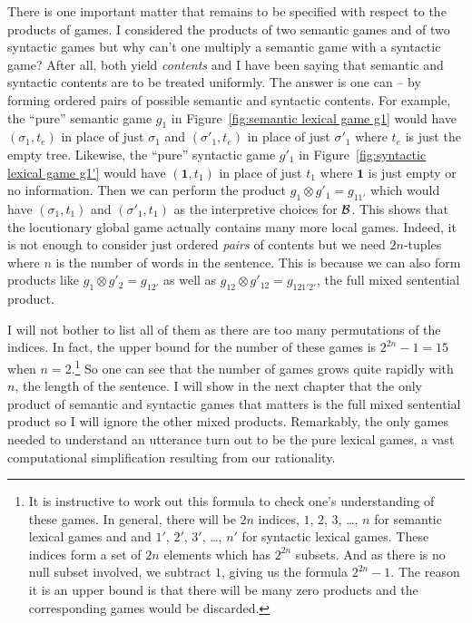 There is one important matter that remains to be specified with respect to the products of games. I considered the products of two semantic games and of two syntactic games but why can't one multiply a semantic game with a syntactic game? After all, both yield \emph{contents} and I have been saying that semantic and syntactic contents are to be treated uniformly. The answer is one can -- by forming ordered pairs of possible semantic and syntactic contents. For example, the ``pure'' semantic game $g_1$ in Figure~\ref{fig:semantic lexical game g1} would have $(\sigma_1,t_e)$ in place of just $\sigma_1$ and $(\sigma'_1,t_e)$ in place of just $\sigma'_1$ where $t_e$ is just the empty tree. Likewise, the ``pure'' syntactic game $g'_1$ in Figure~\ref{fig:syntactic lexical game g1'} would have $(\mathbf{1},t_1)$ in place of just $t_1$ where $\mathbf{1}$ is just empty or no information. Then we can perform the product $g_1 \otimes g'_1 = g_{11'}$ which would have $(\sigma_1,t_1)$ and $(\sigma'_1,t_1)$ as the interpretive choices for $\cal B$. This shows that the locutionary global game actually contains many more local games. Indeed, it is not enough to consider just ordered \emph{pairs} of contents but we need $2n$-tuples where $n$ is the number of words in the sentence. This is because we can also form products like $g_1 \otimes g'_2 = g_{12'}$ as well as $g_{12} \otimes g'_{12} = g_{121'2'}$, the full mixed sentential product.\label{page:mixed products}\largerpage

I will not bother to list all of them as there are too many permutations of the indices. In fact, the upper bound for the number of these games is $2^{2n} - 1 = 15$ when $n = 2$.{\footnote{It is instructive to work out this formula to check one's understanding of these games. In general, there will be $2n$ indices, $1$, $2$, $3$, \ldots, $n$ for semantic lexical games and and $1'$, $2'$, $3'$, \ldots, $n'$ for syntactic lexical games. These indices form a set of $2n$ elements which has $2^{2n}$ subsets. And as there is no null subset involved, we subtract $1$, giving us the formula $2^{2n} - 1$. The reason it is an upper bound is that there will be many zero products and the corresponding games would be discarded.}} So one can see that the number of games grows quite rapidly with $n$, the length of the sentence. I will show in the next chapter that the only product of semantic and syntactic games that matters is the full mixed sentential product so I will ignore the other mixed products. Remarkably, the only games needed to understand an utterance turn out to be the pure lexical games, a vast computational simplification resulting from our rationality.

